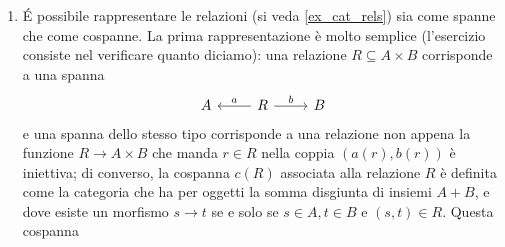 \begin{enumerate}
	\begin{itemize}
		\item $f_1 : [n_1] \to [n_1']$ è una funzione iniettiva e monotòna;
		\item $f_0 : [n_0] \to [n_0']$ è una funzione monotòna;
		\item il diagramma 
		\[\begin{tikzcd}
			{[n_1]}\ar[r, "t"]\ar[d, hook, "{f_1}"'] & {[n_0]} \ar[d, "f_0"]\\ 
			{[n_1']} \ar[r, "{t'}"'] & {[n_0']} \\ 
		\end{tikzcd}\]
		è commutativo;
		\item $f_0^{-1}(H')\subseteq H$.
	\end{itemize}
	Mostrare che questo definisce una categoria $\cate{Seg}^{[{\circ}{\bullet}]}$ dei segmenti binari.\footnote{Un segmento binario è una rappresentazione discreta e semplificata di un cromosoma: la funzione $t$ determina una partizione di $[n_1]$ in $n_0$ sottoinsiemi $t^{-1}(1),t^{-1}(2),\dots t^{-1}(n_0)$ che si può rappresentare come 
	\[[{\circ}{\circ}][{\circ}{\circ}{\circ}{\circ}][{\circ}]\]
	quando $n_0=3$ e $n_1=7$; il sottoinsieme $H\subseteq n_0$ determina poi le regioni del cromosoma $\chi$ che si vogliono usare nella replicazione, e il suo complementare $H^c$ quelle che sono silenziate (\emph{masking}). Se ad esempio $H\subseteq [3]$ è l'insieme $\{1,3\}$, possiamo colorare la partizione di sopra come 
	\[[{\bullet}{\bullet}][{\circ}{\circ}{\circ}{\circ}][{\bullet}].\]
	Invitiamo chi legge a trovare quale possa essere una interpretazione per un omomorfismo di segmenti!}
\item \'E possibile rappresentare le relazioni (si veda \ref{ex_cat_rels}) sia come spanne che come cospanne. La prima rappresentazione è molto semplice (l'esercizio consiste nel verificare quanto diciamo): una relazione $R\subseteq A\times B$ corrisponde a una spanna 
\[
  \begin{tikzcd}
  A & R \ar[r, "b"]\ar[l, "a"']& B
\end{tikzcd}
\]
e una spanna dello stesso tipo corrisponde a una relazione non appena la funzione $R \to A\times B$ che manda $r\in R$ nella coppia $(a(r),b(r))$ è iniettiva; di converso, la cospanna $c(R)$ associata alla relazione $R$ è definita come la categoria che ha per oggetti la somma disgiunta di insiemi $A+B$, e dove esiste un morfismo $s\to t$ se e solo se $s\in A,t\in B$ e $(s,t)\in R$. Questa cospanna 
\[
  \begin{tikzcd}

\end{tikzcd}\]
\end{enumerate}
